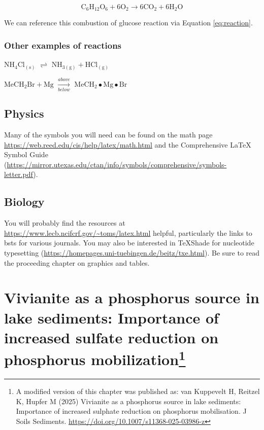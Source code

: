\documentclass[12pt,twoside]{book}
\begin{document}
\begin{equation}
  \mathrm{C_6H_{12}O_6  + 6O_2} \longrightarrow \mathrm{6CO_2 + 6H_2O}
  \label{eq:reaction}
\end{equation}

We can reference this combustion of glucose reaction via Equation \eqref{eq:reaction}.

\subsection{Other examples of reactions}\label{other-examples-of-reactions}

\(\mathrm{NH_4Cl_{(s)}}\) \(\rightleftharpoons\) \(\mathrm{NH_{3(g)}+HCl_{(g)}}\)

\noindent \(\mathrm{MeCH_2Br + Mg}\) \(\xrightarrow[below]{above}\) \(\mathrm{MeCH_2\bullet Mg \bullet Br}\)

\section{Physics}\label{physics}

Many of the symbols you will need can be found on the math page \url{https://web.reed.edu/cis/help/latex/math.html} and the Comprehensive LaTeX Symbol Guide (\url{https://mirror.utexas.edu/ctan/info/symbols/comprehensive/symbols-letter.pdf}).

\section{Biology}\label{biology}

You will probably find the resources at \url{https://www.lecb.ncifcrf.gov/~toms/latex.html} helpful, particularly the links to bsts for various journals. You may also be interested in TeXShade for nucleotide typesetting (\url{https://homepages.uni-tuebingen.de/beitz/txe.html}). Be sure to read the proceeding chapter on graphics and tables.

\chapter[Vivianite as a phosphorus source in lake sediments: Importance of increased sulfate reduction on phosphorus mobilization]{\texorpdfstring{Vivianite as a phosphorus source in lake sediments: Importance of increased sulfate reduction on phosphorus mobilization\footnote{A modified version of this chapter was published as: van Kuppevelt H, Reitzel K, Hupfer M (2025) Vivianite as a phosphorus source in lake sediments: Importance of increased sulphate reduction on phosphorus mobilisation. J Soils Sediments. \url{https://doi.org/10.1007/s11368-025-03986-z}}}{Vivianite as a phosphorus source in lake sediments: Importance of increased sulfate reduction on phosphorus mobilization}}\label{vivianite-as-a-phosphorus-source-in-lake-sediments-importance-of-increased-sulfate-reduction-on-phosphorus-mobilization01-paper2}
\end{document}
